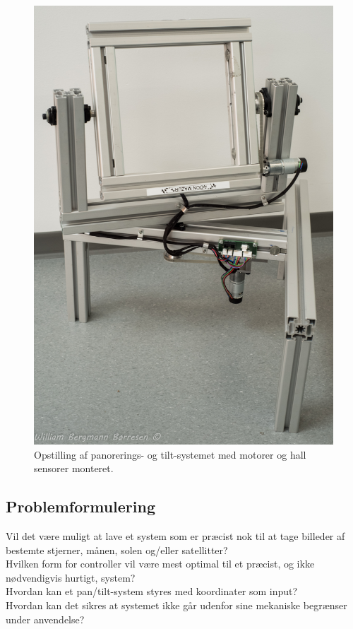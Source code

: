\begin{figure}[H]
	\begin{center}
		\includegraphics[scale=0.15]{Billeder/opstilling.jpg}
		\caption{Opstilling af panorerings- og tilt-systemet med motorer og hall sensorer monteret.}
		\label{fig:Opstilling}
	\end{center}
\end{figure}

\subsection{Problemformulering}

Vil det være muligt at lave et system som er præcist nok til at tage billeder af bestemte stjerner, månen, solen og/eller satellitter?\\
Hvilken form for controller vil være mest optimal til et præcist, og ikke nødvendigvis hurtigt, system?\\
Hvordan kan et pan/tilt-system styres med koordinater som input?\\
Hvordan kan det sikres at systemet ikke går udenfor sine mekaniske begrænser under anvendelse?

